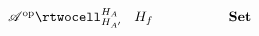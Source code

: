 \documentclass[preview]{standalone}
\begin{document}
\begin{equation*}
  \xymatrix@C+2pc{
\mathsf{\mathscr{A}^\text{op}} \rtwocell^{H_A}_{H_{A'}}{\;\;\;H_f} & \mathbf{Set}
}
\end{equation*}
\end{document}
